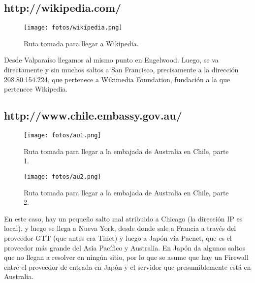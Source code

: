 \documentclass[letterpaper,10pt,onecolumn,titlepage]{article}
\begin{document}
  \subsection{http://wikipedia.com/}
  \begin{figure}[H]
    \caption{Ruta tomada para llegar a Wikipedia.}
    \centering
    \texttt{[image: fotos/wikipedia.png]}
    \label{fig:wiki}
  \end{figure}
  Desde Valparaíso llegamos al mismo punto en Engelwood. Luego, se va directamente y sin muchos saltos a San Francisco, precisamente a la dirección 208.80.154.224, que pertenece a Wikimedia Foundation, fundación a la que pertenece Wikipedia.

  \subsection{http://www.chile.embassy.gov.au/}
  \begin{figure}[H]
    \caption{Ruta tomada para llegar a la embajada de Australia en Chile, parte 1.}
    \centering
    \texttt{[image: fotos/au1.png]}
    \label{fig:au1}
  \end{figure}
  \begin{figure}[H]
    \caption{Ruta tomada para llegar a la embajada de Australia en Chile, parte 2.}
    \centering
    \texttt{[image: fotos/au2.png]}
    \label{fig:au2}
  \end{figure}
  En este caso, hay un pequeño salto mal atribuido a Chicago (la dirección IP es local), y luego se llega a Nueva York, desde donde sale a Francia a través del proveedor GTT (que antes era Tinet) y luego a Japón vía Pacnet, que es el proveedor más grande del Asia Pacífico y Australia. En Japón da algunos saltos que no llegan a resolver en ningún sitio, por lo que se asume que hay un Firewall entre el proveedor de entrada en Japón y el servidor que presumiblemente está en Australia.
\end{document}
